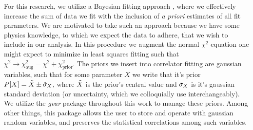 For this research, we utilize a Bayesian fitting approach \cite{Carlin1997}, where we effectively increase the sum of data we fit with the inclusion of \textit{a priori} estimates of all fit parameters.  
We are motivated to take such an approach because we have some physics knowledge, to which we expect the data to adhere, that we wish to include in our analysis.
In this procedure we augment the normal $\chi^2$ equation one might expect to minimize in least squares fitting such that $\chi^2 \rightarrow \chi^2_\mathrm{aug} = \chi^2 + \chi_{\text{prior}}^2$.  The priors we insert into correlator fitting are gaussian variables, such that for some parameter $X$ we write that it's prior $P[X] = \Tilde{X} \pm \Tilde{\sigma}_X$, where $ \Tilde{X}$ is the prior's central value and $\Tilde{\sigma}_X$ is it's gaussian standard deviation (or uncertainty, which we colloquially use interchangeably).  We utilize the \textit{gvar} package \cite{gvar_package} throughout this work to manage these priors.  Among other things, this package allows the user to store and operate with gaussian random variables, and preserves the statistical correlations among such variables.


